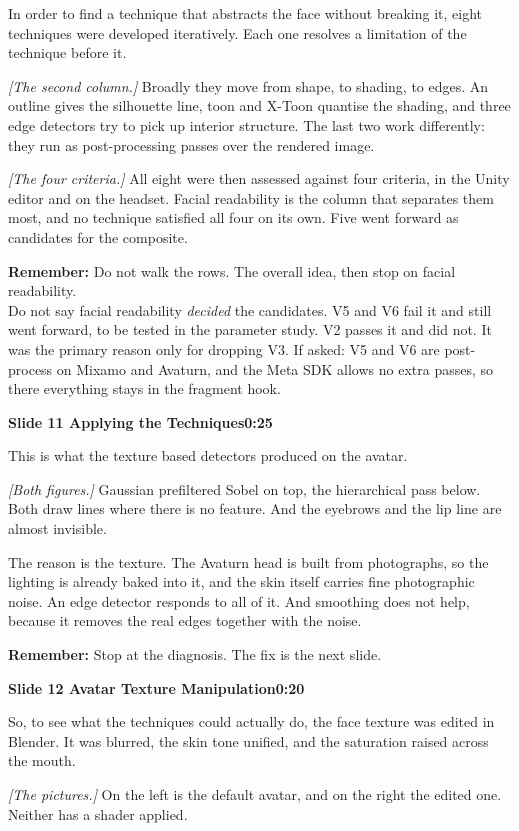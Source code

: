 \documentclass[11pt,a4paper]{article}
\newcommand{\slidehead}[3]{%
  \needspace{5\baselineskip}
  \vspace{0.9em}
  \noindent\colorbox{knblue}{\parbox{0.978\textwidth}{\vspace{1pt}\color{white}\textbf{Slide #1 \quad #2}\hfill\textbf{#3}\vspace{1pt}}}
  \vspace{0.35em}\par}
\newcommand{\remind}[1]{%
  \vspace{0.15em}
  \noindent\colorbox{knlight}{\parbox{0.972\textwidth}{\small\color{knblue}\textbf{Remember:} #1}}
  \vspace{0.2em}\par}
\newcommand{\pointto}[1]{{\color{knaccent}\textit{[#1]}}}
\begin{document}
In order to find a technique that abstracts the face without breaking it, eight techniques were developed iteratively. Each one resolves a limitation of the technique before it.

\pointto{The second column.} Broadly they move from shape, to shading, to edges. An outline gives the silhouette line, toon and X-Toon quantise the shading, and three edge detectors try to pick up interior structure. The last two work differently: they run as post-processing passes over the rendered image.

\pointto{The four criteria.} All eight were then assessed against four criteria, in the Unity editor and on the headset. Facial readability is the column that separates them most, and no technique satisfied all four on its own. Five went forward as candidates for the composite.

\remind{Do not walk the rows. The overall idea, then stop on facial readability.\\[0.4em] Do not say facial readability \emph{decided} the candidates. V5 and V6 fail it and still went forward, to be tested in the parameter study. V2 passes it and did not. It was the primary reason only for dropping V3. If asked: V5 and V6 are post-process on Mixamo and Avaturn, and the Meta SDK allows no extra passes, so there everything stays in the fragment hook.}

\slidehead{11}{Applying the Techniques}{0:25}

This is what the texture based detectors produced on the avatar.

\pointto{Both figures.} Gaussian prefiltered Sobel on top, the hierarchical pass below. Both draw lines where there is no feature. And the eyebrows and the lip line are almost invisible.

The reason is the texture. The Avaturn head is built from photographs, so the lighting is already baked into it, and the skin itself carries fine photographic noise. An edge detector responds to all of it. And smoothing does not help, because it removes the real edges together with the noise.

\remind{Stop at the diagnosis. The fix is the next slide.}

\slidehead{12}{Avatar Texture Manipulation}{0:20}

So, to see what the techniques could actually do, the face texture was edited in Blender. It was blurred, the skin tone unified, and the saturation raised across the mouth.

\pointto{The pictures.} On the left is the default avatar, and on the right the edited one. Neither has a shader applied.
\end{document}
